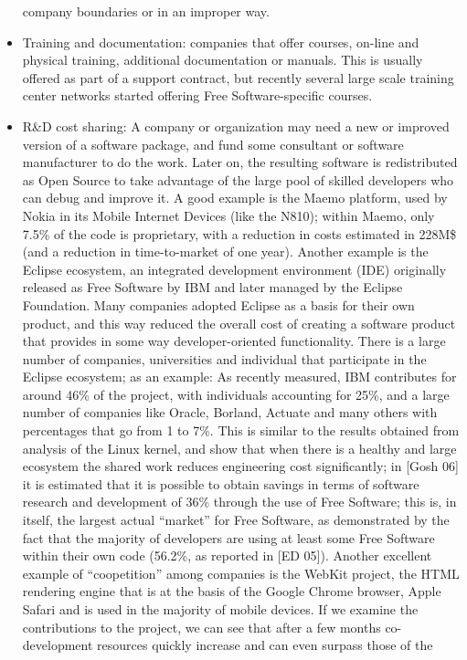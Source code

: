 \begin{itemize}
company boundaries or in an improper way.
 \item Training and documentation: companies that offer courses, on-line and
physical training, additional documentation or manuals. This is usually offered
as part of a support contract, but recently several large scale training center
networks started offering Free Software-specific courses.
 \item R\&D cost sharing: A company or organization may need a new or improved
version of a software package, and fund some consultant or software manufacturer
to do the work. Later on, the resulting software is redistributed as Open Source
to take advantage of the large pool of skilled developers who can debug and
improve it. A good example is the Maemo platform, used by Nokia in its Mobile
Internet Devices (like the N810); within Maemo, only 7.5\% of the code is
proprietary, with a reduction in costs estimated in 228M\$ (and a reduction in
time-to-market of one year). Another example is the Eclipse ecosystem, an
integrated development environment (IDE) originally released as Free Software by
IBM and later managed by the Eclipse Foundation. Many companies adopted Eclipse
as a basis for their own product, and this way reduced the overall cost of
creating a software product that provides in some way developer-oriented
functionality. There is a large number of companies, universities and individual
that participate in the Eclipse ecosystem; as an example: As
recently measured, IBM contributes for around 46\% of the project, with
individuals accounting for 25\%, and a large number of companies like Oracle,
Borland, Actuate and many others with percentages that go from 1 to 7\%. This is
similar to the results obtained from analysis of the Linux kernel, and show that
when there is a healthy and large ecosystem the shared work reduces engineering
cost significantly; in [Gosh 06] it is estimated that it is possible to obtain
savings in terms of software research and development of 36\% through the use of
Free Software; this is, in itself, the largest actual ``market'' for Free
Software, as demonstrated by the fact that the majority of developers are using
at least some Free Software within their own code (56.2\%, as reported in [ED
05]). Another excellent example of ``coopetition'' among companies is the WebKit
project, the HTML rendering engine that is at the basis of the Google Chrome
browser, Apple Safari and is used in the majority of mobile devices. If we
examine the contributions to the project, we can see that after a few months
co-development resources quickly increase and can even surpass those of the

\end{itemize}
